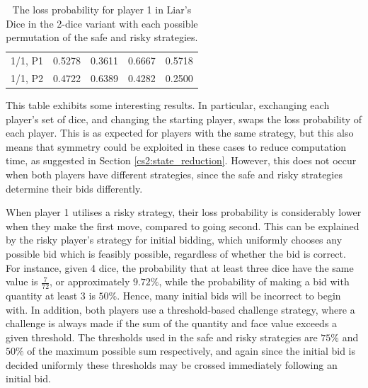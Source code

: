 \begin{table}[h]
\begin{tabular}{lllll}
    \multicolumn{1}{l|}{1/1, P1} & 0.5278                                                                        & 0.3611                                                                          & 0.6667                                                                         & 0.5718                                                                         \\
    \multicolumn{1}{l|}{1/1, P2} & 0.4722                                                                        & 0.6389                                                                          & 0.4282                                                                         & 0.2500                                                                        
    \end{tabular}
    \vspace*{0.1cm}
    \caption{The loss probability for player 1 in Liar's Dice in the 2-dice variant with each possible permutation of the safe and risky strategies.}
    \label{cs2:game_tree_table}
     \vspace*{-0.2cm}
     \end{table}

This table exhibits some interesting results. In particular, exchanging each player's set of dice, and changing the starting player, swaps the loss probability of each player. This is as expected for players with the same strategy, but this also means that symmetry could be exploited in these cases to reduce computation time, as suggested in Section \ref{cs2:state_reduction}. However, this does not occur when both players have different strategies, since the safe and risky strategies determine their bids differently.

When player 1 utilises a risky strategy, their loss probability is considerably lower when they make the first move, compared to going second. This can be explained by the risky player's strategy for initial bidding, which uniformly chooses any possible bid which is feasibly possible, regardless of whether the bid is correct. For instance, given 4 dice, the probability that at least three dice have the same value is $\frac{7}{72}$, or approximately $9.72\%$, while the probability of making a bid with quantity at least 3 is $50\%$. Hence, many initial bids will be incorrect to begin with. In addition, both players use a threshold-based challenge strategy, where a challenge is always made if the sum of the quantity and face value exceeds a given threshold. The thresholds used in the safe and risky strategies are $75\%$ and $50\%$ of the maximum possible sum respectively, and again since the initial bid is decided uniformly these thresholds may be crossed immediately following an initial bid.

